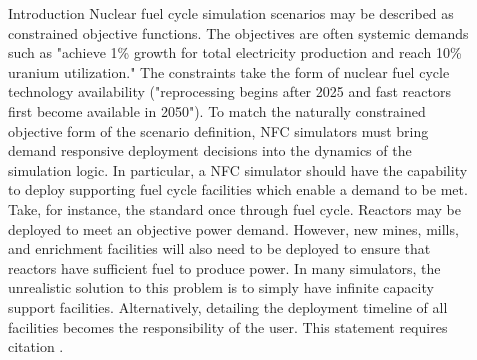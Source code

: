 \documentclass[final]{beamer}
\newlength{\sepwid}
\newlength{\onecolwid}
\newlength{\twocolwid}
\begin{document}
\begin{frame}[t]
\begin{columns}[t]
\begin{column}{\onecolwid}
\begin{block}{Introduction}
Nuclear fuel cycle simulation scenarios may be described as constrained objective functions. The objectives are often systemic demands such as "achieve 1\% growth for total electricity production and reach 10\% uranium utilization." The constraints take the form of nuclear fuel cycle technology availability ("reprocessing begins after 2025 and fast reactors first become available in 2050"). To match the naturally constrained objective form of the scenario definition, NFC simulators must bring demand responsive deployment decisions into the dynamics of the simulation logic.
In particular, a NFC simulator should have the capability to deploy supporting fuel cycle facilities which enable a demand to be met. Take, for instance, the standard once through fuel cycle. Reactors may be deployed to meet an objective power demand. However, new mines, mills, and enrichment facilities will also need to be deployed to ensure that reactors have sufficient fuel to produce power. In many simulators, the unrealistic solution to this problem is to simply have infinite capacity support facilities. Alternatively, detailing the deployment timeline of all facilities becomes the responsibility of the user.
This statement requires citation \cite{Smith:2012qr}.

\end{block}




\end{column} %

\begin{column}{\sepwid}\end{column} %

\begin{column}{\twocolwid} %

\begin{columns}[t,totalwidth=\twocolwid] %

\begin{column}{\onecolwid}\vspace{-.6in} %



\end{column}
\end{columns}
\end{column}
\end{columns}
\end{frame}
\end{document}
